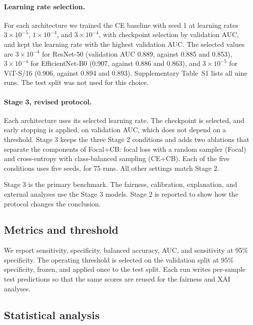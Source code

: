 \paragraph{Learning rate selection.} For each architecture we trained the CE baseline with seed 1 at learning rates $3\times10^{-5}$, $1\times10^{-4}$, and $3\times10^{-4}$, with checkpoint selection by validation AUC, and kept the learning rate with the highest validation AUC. The selected values are $3\times10^{-4}$ for ResNet-50 (validation AUC 0.889, against 0.885 and 0.853), $3\times10^{-4}$ for EfficientNet-B0 (0.907, against 0.886 and 0.863), and $3\times10^{-5}$ for ViT-S/16 (0.906, against 0.894 and 0.893). Supplementary Table~S1 lists all nine runs. The test split was not used for this choice.

\paragraph{Stage 3, revised protocol.} Each architecture uses its selected learning rate. The checkpoint is selected, and early stopping is applied, on validation AUC, which does not depend on a threshold. Stage 3 keeps the three Stage 2 conditions and adds two ablations that separate the components of Focal+CB: focal loss with a random sampler (Focal) and cross-entropy with class-balanced sampling (CE+CB). Each of the five conditions uses five seeds, for 75 runs. All other settings match Stage 2.

Stage 3 is the primary benchmark. The fairness, calibration, explanation, and external analyses use the Stage 3 models. Stage 2 is reported to show how the protocol changes the conclusion.

\subsection{Metrics and threshold}

We report sensitivity, specificity, balanced accuracy, AUC, and sensitivity at 95\% specificity. The operating threshold is selected on the validation split at 95\% specificity, frozen, and applied once to the test split. Each run writes per-sample test predictions so that the same scores are reused for the fairness and XAI analyses.

\subsection{Statistical analysis}

